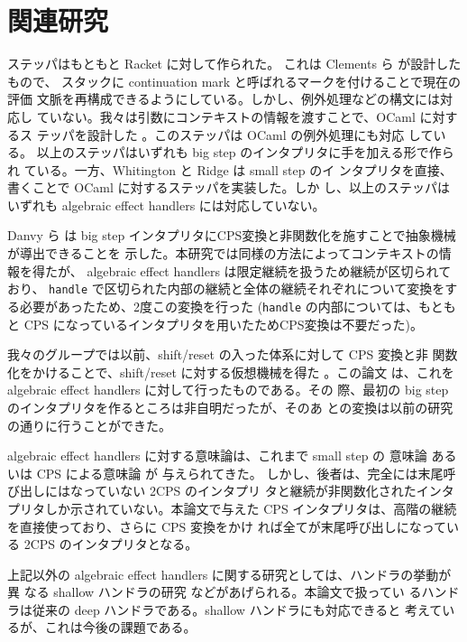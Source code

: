 \section{関連研究}
\label{section:related}

ステッパはもともと Racket に対して作られた。
これは Clements ら \cite{clements01} が設計したもので、
スタックに continuation mark と呼ばれるマークを付けることで現在の評価
文脈を再構成できるようにしている。しかし、例外処理などの構文には対応し
ていない。我々は引数にコンテキストの情報を渡すことで、OCaml に対するス
テッパを設計した \cite{FCA19}。このステッパは OCaml の例外処理にも対応
している。
以上のステッパはいずれも big step のインタプリタに手を加える形で作られ
ている。一方、Whitington と Ridge \cite{EPTCS294.3} は small step のイ
ンタプリタを直接、書くことで OCaml に対するステッパを実装した。しか
し、以上のステッパはいずれも algebraic effect handlers には対応していない。

Danvy ら \cite{10.1145/1411204.1411206} は
big step インタプリタにCPS変換と非関数化を施すことで抽象機械が導出できることを
示した。本研究では同様の方法によってコンテキストの情報を得たが、
algebraic effect handlers は限定継続を扱うため継続が区切られており、
\texttt{handle} で区切られた内部の継続と全体の継続それぞれについて変換をする必要があったため、2度この変換を行った
(\texttt{handle} の内部については、もともと CPS になっているインタプリタを用いたためCPS変換は不要だった)。

我々のグループでは以前、shift/reset の入った体系に対して CPS 変換と非
関数化をかけることで、shift/reset に対する仮想機械を得た \cite{AK2010}。この論文
は、これを algebraic effect handlers に対して行ったものである。その
際、最初の big step のインタプリタを作るところは非自明だったが、そのあ
との変換は以前の研究の通りに行うことができた。

algebraic effect handlers に対する意味論は、これまで small step の
意味論 \cite{10.1145/2500365.2500590}
あるいは CPS による意味論 \cite{10.1145/2976022.2976033, e6cb0c3222794e48bf38cf44e46fe4aa} が
与えられてきた。
しかし、後者は、完全には末尾呼び出しにはなっていない 2CPS のインタプリ
タと継続が非関数化されたインタプリタしか示されていない。本論文で与えた
CPS インタプリタは、高階の継続を直接使っており、さらに CPS 変換をかけ
れば全てが末尾呼び出しになっている 2CPS のインタプリタとなる。

上記以外の algebraic effect handlers に関する研究としては、ハンドラの挙動が異
なる shallow ハンドラの研究 \cite{10.1007/978-3-030-02768-1_22}
などがあげられる。本論文で扱ってい
るハンドラは従来の deep ハンドラである。shallow ハンドラにも対応できると
考えているが、これは今後の課題である。

